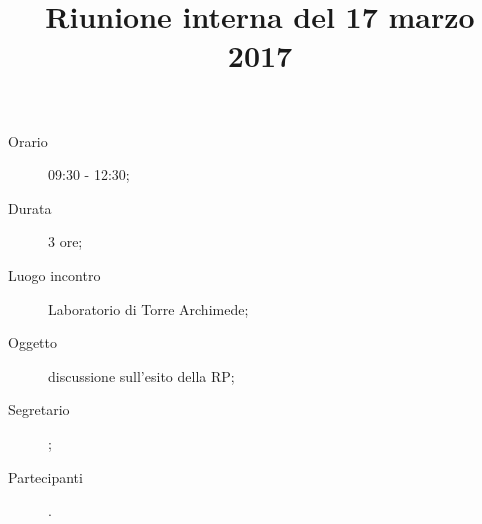 


\author{\GG}
\supervisor{\LB}
\dest{\ALL}
\title{Riunione interna del 17 marzo 2017}



\maketitle

\begin{description}
	\item[Orario] 09:30 - 12:30;
	\item[Durata] 3 ore;
	\item[Luogo incontro] Laboratorio di Torre Archimede;
	\item[Oggetto] discussione sull'esito della RP;
	\item[Segretario] \AZ;
	\item[Partecipanti] \ALL.
\end{description}

